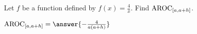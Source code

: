 \documentclass{ximera}
\author{Kenneth Berglund}
\begin{document}
\licenseSZ
\begin{exercise}
Let $f$ be a function defined by $f(x) = \frac{4}{x}$. Find $\mathrm{AROC}_{[a, a+h]}$.

$\av_{[a, a+h]} = \answer{-\frac{4}{a(a+h)}}$

\end{exercise}
\end{document}
